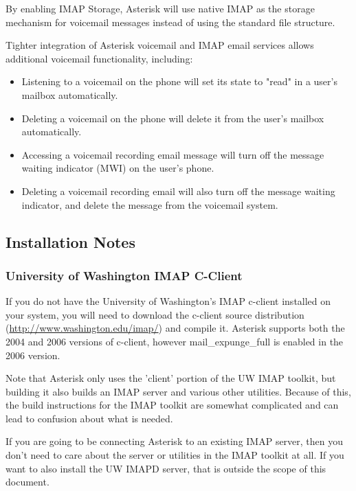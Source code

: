 By enabling IMAP Storage,  Asterisk will use native IMAP as the storage
mechanism for voicemail messages instead of using the standard file structure.

Tighter integration of Asterisk voicemail and IMAP email services allows
additional voicemail functionality, including:

\begin{itemize}
 \item Listening to a voicemail on the phone will set its state to "read" in
   a user's mailbox automatically.
 \item Deleting a voicemail on the phone will delete it from the user's
   mailbox automatically.
 \item Accessing a voicemail recording email message will turn off the message
   waiting indicator (MWI) on the user's phone.
 \item Deleting a voicemail recording email will also turn off the message
   waiting indicator, and delete the message from the voicemail system.
\end{itemize}

\subsection{Installation Notes}

\subsubsection{University of Washington IMAP C-Client}

If you do not have the University of Washington's IMAP c-client
installed on your system, you will need to download the c-client
source distribution (\url{http://www.washington.edu/imap/}) and compile it.
Asterisk supports both the 2004 and 2006 versions of c-client, however
mail\_expunge\_full is enabled in the 2006 version.

Note that Asterisk only uses the 'client' portion of the UW IMAP toolkit,
but building it also builds an IMAP server and various other utilities.
Because of this, the build instructions for the IMAP toolkit are somewhat
complicated and can lead to confusion about what is needed.

If you are going to be connecting Asterisk to an existing IMAP server,
then you don't need to care about the server or utilities in the IMAP
toolkit at all. If you want to also install the UW IMAPD server, that
is outside the scope of this document.

